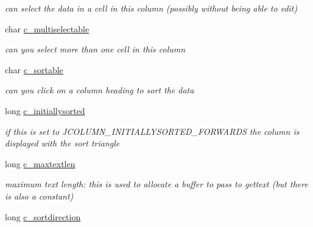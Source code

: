 \begin{DoxyCompactItemize}
\begin{DoxyCompactList}\small\item\em can select the data in a cell in this column (possibly without being able to edit) \item\end{DoxyCompactList}\item 
\hypertarget{structt__jcolumn_a6232390b4319837ba0ed5b021361d2f4}{
char \hyperlink{structt__jcolumn_a6232390b4319837ba0ed5b021361d2f4}{c\_\-multiselectable}}
\label{structt__jcolumn_a6232390b4319837ba0ed5b021361d2f4}

\begin{DoxyCompactList}\small\item\em can you select more than one cell in this column \item\end{DoxyCompactList}\item 
\hypertarget{structt__jcolumn_a2a1ca29c74cc32cff441480ad2475a7f}{
char \hyperlink{structt__jcolumn_a2a1ca29c74cc32cff441480ad2475a7f}{c\_\-sortable}}
\label{structt__jcolumn_a2a1ca29c74cc32cff441480ad2475a7f}

\begin{DoxyCompactList}\small\item\em can you click on a column heading to sort the data \item\end{DoxyCompactList}\item 
\hypertarget{structt__jcolumn_a681f83bdb92c6ebea21e7e6544d59cfa}{
long \hyperlink{structt__jcolumn_a681f83bdb92c6ebea21e7e6544d59cfa}{c\_\-initiallysorted}}
\label{structt__jcolumn_a681f83bdb92c6ebea21e7e6544d59cfa}

\begin{DoxyCompactList}\small\item\em if this is set to JCOLUMN\_\-INITIALLYSORTED\_\-FORWARDS the column is displayed with the sort triangle \item\end{DoxyCompactList}\item 
\hypertarget{structt__jcolumn_a6db1f356141f86a42b8b103e56ed3491}{
long \hyperlink{structt__jcolumn_a6db1f356141f86a42b8b103e56ed3491}{c\_\-maxtextlen}}
\label{structt__jcolumn_a6db1f356141f86a42b8b103e56ed3491}

\begin{DoxyCompactList}\small\item\em maximum text length: this is used to allocate a buffer to pass to gettext (but there is also a constant) \item\end{DoxyCompactList}\item 
\hypertarget{structt__jcolumn_a5932bdd25196a0e2907cde189e041dba}{
long \hyperlink{structt__jcolumn_a5932bdd25196a0e2907cde189e041dba}{c\_\-sortdirection}}
\label{structt__jcolumn_a5932bdd25196a0e2907cde189e041dba}


\end{DoxyCompactItemize}
